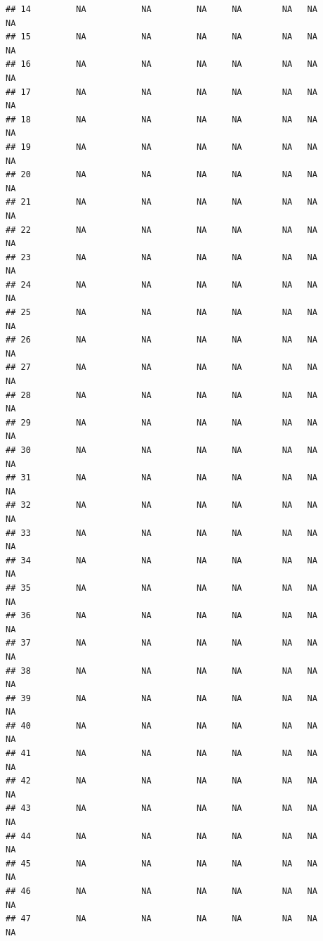 \documentclass[
]{article}
\begin{document}
\begin{verbatim}
## 14         NA           NA         NA     NA        NA   NA             NA
## 15         NA           NA         NA     NA        NA   NA             NA
## 16         NA           NA         NA     NA        NA   NA             NA
## 17         NA           NA         NA     NA        NA   NA             NA
## 18         NA           NA         NA     NA        NA   NA             NA
## 19         NA           NA         NA     NA        NA   NA             NA
## 20         NA           NA         NA     NA        NA   NA             NA
## 21         NA           NA         NA     NA        NA   NA             NA
## 22         NA           NA         NA     NA        NA   NA             NA
## 23         NA           NA         NA     NA        NA   NA             NA
## 24         NA           NA         NA     NA        NA   NA             NA
## 25         NA           NA         NA     NA        NA   NA             NA
## 26         NA           NA         NA     NA        NA   NA             NA
## 27         NA           NA         NA     NA        NA   NA             NA
## 28         NA           NA         NA     NA        NA   NA             NA
## 29         NA           NA         NA     NA        NA   NA             NA
## 30         NA           NA         NA     NA        NA   NA             NA
## 31         NA           NA         NA     NA        NA   NA             NA
## 32         NA           NA         NA     NA        NA   NA             NA
## 33         NA           NA         NA     NA        NA   NA             NA
## 34         NA           NA         NA     NA        NA   NA             NA
## 35         NA           NA         NA     NA        NA   NA             NA
## 36         NA           NA         NA     NA        NA   NA             NA
## 37         NA           NA         NA     NA        NA   NA             NA
## 38         NA           NA         NA     NA        NA   NA             NA
## 39         NA           NA         NA     NA        NA   NA             NA
## 40         NA           NA         NA     NA        NA   NA             NA
## 41         NA           NA         NA     NA        NA   NA             NA
## 42         NA           NA         NA     NA        NA   NA             NA
## 43         NA           NA         NA     NA        NA   NA             NA
## 44         NA           NA         NA     NA        NA   NA             NA
## 45         NA           NA         NA     NA        NA   NA             NA
## 46         NA           NA         NA     NA        NA   NA             NA
## 47         NA           NA         NA     NA        NA   NA             NA

\end{verbatim}
\end{document}
